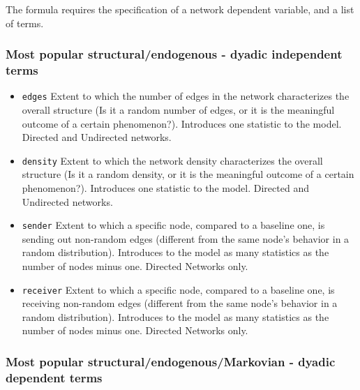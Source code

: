 \documentclass[
]{article}
\begin{document}
The formula requires the specification of a network dependent variable,
and a list of terms.

\hypertarget{most-popular-structuralendogenous---dyadic-independent-terms}{%
\subsubsection{Most popular structural/endogenous - dyadic independent
terms}\label{most-popular-structuralendogenous---dyadic-independent-terms}}

\begin{itemize}
\item
  \texttt{edges} Extent to which the number of edges in the network
  characterizes the overall structure (Is it a random number of edges,
  or it is the meaningful outcome of a certain phenomenon?). Introduces
  one statistic to the model. Directed and Undirected networks.
\item
  \texttt{density} Extent to which the network density characterizes the
  overall structure (Is it a random density, or it is the meaningful
  outcome of a certain phenomenon?). Introduces one statistic to the
  model. Directed and Undirected networks.
\item
  \texttt{sender} Extent to which a specific node, compared to a
  baseline one, is sending out non-random edges (different from the same
  node's behavior in a random distribution). Introduces to the model as
  many statistics as the number of nodes minus one. Directed Networks
  only.
\item
  \texttt{receiver} Extent to which a specific node, compared to a
  baseline one, is receiving non-random edges (different from the same
  node's behavior in a random distribution). Introduces to the model as
  many statistics as the number of nodes minus one. Directed Networks
  only.
\end{itemize}

\hypertarget{most-popular-structuralendogenousmarkovian---dyadic-dependent-terms}{%
\subsubsection{Most popular structural/endogenous/Markovian - dyadic
dependent
terms}\label{most-popular-structuralendogenousmarkovian---dyadic-dependent-terms}}
\end{document}
